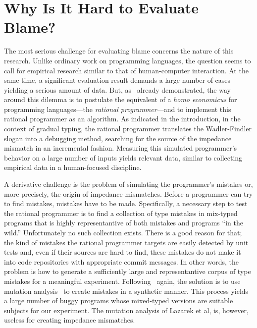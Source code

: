 
\section{Why Is It Hard to Evaluate Blame?}
\label{sec:challenges}

The most serious challenge for evaluating blame concerns 
the nature of this research. Unlike ordinary
work on programming languages, the question seems to call for empirical research
similar to that of human-computer interaction. At the same time, a
significant evaluation result demands a large number of cases yielding a serious
amount of data. But, as~\citet{lksfd-popl-2020} already demonstrated, the way
around this dilemma is to postulate the equivalent of a {\it homo economicus\/}
for programming languages---the {\em rational programmer\/}---and to implement
this rational programmer as an algorithm.  As indicated in the introduction, in
the context of gradual typing, the rational programmer translates the
Wadler-Findler slogan into a debugging method, searching for the source of the
impedance mismatch in an incremental fashion. Measuring this simulated
programmer's behavior on a large number of inputs yields relevant 
data, similar to collecting empirical data in a human-focused discipline. 

A derivative challenge is the problem of simulating the programmer's
mistakes or, more precisely, the origin of impedance mismatches. Before a
programmer can try to find mistakes, mistakes have to be made.
Specifically, a necessary step to test the rational programmer is to find
a collection of  type mistakes in  mix-typed programs that is highly
representantive of both mistakes and programs ``in the wild.''
Unfortunately no such collection exists.  There is a good reason for that;
the kind of mistakes the rational programmer targets are easily detected
by unit tests and, even if their sources are hard to find, these mistakes do not make it
into code repositories with appropriate commit messages.  In other words, the problem is how to generate a
sufficiently large and representantive corpus of type mistakes for a meaningful
experiment.  Following~\citet{lksfd-popl-2020} again, the solution is to
use mutation analysis~\cite{lipton1971fault, demillo1978hints,
jia2011analysis} to create mistakes in a synthetic manner. This process
yields a large number of buggy programs whose mixed-typed versions are
suitable subjects for our experiment.  The mutation analysis of Lazarek et
al, is, however, useless for creating impedance mismatches.

